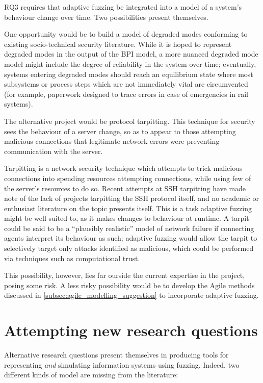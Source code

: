 \documentclass[11pt]{article}
\begin{document}
RQ3 requires that adaptive fuzzing be integrated into a model of a system's
behaviour change over time. Two possibilities present themselves.

One opportunity would be to build a model of degraded modes conforming to
existing socio-technical security literature. While it is hoped to represent
degraded modes in the output of the BPI model, a more nuanced degraded mode
model might include the degree of reliability in the system over time;
eventually, systems entering degraded modes should reach an equilibrium state
where most subsystems or process steps which are not immediately vital are
circumvented (for example, paperwork designed to trace errors in case of
emergencies in rail systems).

The alternative project would be protocol tarpitting. This technique for
security sees the behaviour of a server change, so as to appear to those
attempting malicious connections that legitimate network errors were preventing
communication with the server.\par

Tarpitting is a network security technique which attempts to trick malicious
connections into spending resources attempting connections, while using few of
the server's resources to do so. Recent attempts at SSH
tarpitting\cite{endlessh} have made note of the lack of projects tarpitting the
SSH protocol itself, and no academic or enthusiast literature on the topic
presents itself. This is a task adaptive fuzzing might be well suited to, as it
makes changes to behaviour at runtime. A tarpit could be said to be a
``plausibly realistic'' model of network failure if connecting agents interpret
its behaviour as such; adaptive fuzzing would allow the tarpit to selectively
target only attacks identified as malicious, which could be performed via
techniques such as computational trust\cite{marsh_thesis}.

This possibility, however, lies far ourside the current expertise in the
project, posing some risk. A less risky possibility would be to develop the
Agile methods discussed in \cref{subsec:agile_modelling_suggestion} to
incorporate adaptive fuzzing.


\section{Attempting new research questions}
\label{sec:orga6a3d4c}
\label{sec:new_questions}
Alternative research questions present themselves in producing tools for
representing \emph{and} simulating information systems using fuzzing. Indeed, two
different kinds of model are missing from the literature:
\end{document}

